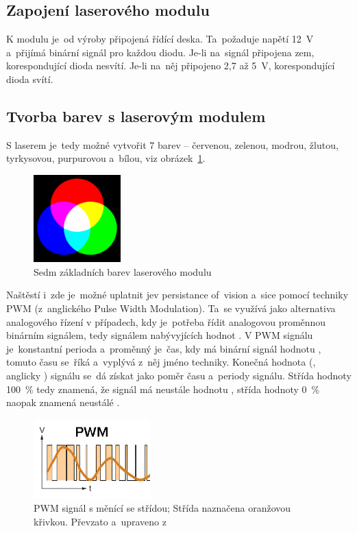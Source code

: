 \subsection{Zapojení laserového modulu}
K modulu je~od výroby připojená řídící deska. Ta~požaduje napětí 12~V a~přijímá binární signál pro každou diodu. Je-li na~signál připojena zem, korespondující dioda nesvítí. Je-li na~něj připojeno 2,7 až 5~V, korespondující dioda svítí.

\subsection{Tvorba barev s laserovým modulem}
S laserem je~tedy možné vytvořit 7 barev -- červenou, zelenou, modrou, žlutou, tyrkysovou, purpurovou a~bílou, viz obrázek~\ref{fig:7colors}.

\begin{figure}[htb]
  \centering
  \includegraphics[width=0.3\textwidth]{img/7colors.png}
  \caption{\label{fig:7colors} Sedm základních barev laserového modulu}
\end{figure}

Naštěstí i~zde je~možné uplatnit jev persistance of~vision a~sice pomocí techniky PWM (z~anglického Pulse Width Modulation). Ta~se využívá jako alternativa analogového řízení v případech, kdy je~potřeba řídit analogovou proměnnou binárním signálem, tedy signálem nabývyjících hodnot .
V PWM signálu je~konstantní perioda a~proměnný je~čas, kdy má binární signál hodnotu , tomuto času se~říká  a~vyplývá z~něj jméno techniky. Konečná hodnota (, anglicky ) signálu se~dá získat jako poměr času  a~periody signálu. Střída hodnoty 100~\% tedy znamená, že signál má neustále hodnotu , střída hodnoty 0~\% naopak znamená neustálé .~\cite{pwm}\cite{wiki_pwm}

\begin{figure}[htb]
  \centering
  \includegraphics[width=0.4\textwidth]{img/pwm.jpg}
  \caption{\label{fig:pwm} PWM signál s měnící se střídou; Střída naznačena oranžovou křivkou. Převzato a~upraveno z~\cite{pwm-image}}
\end{figure}

